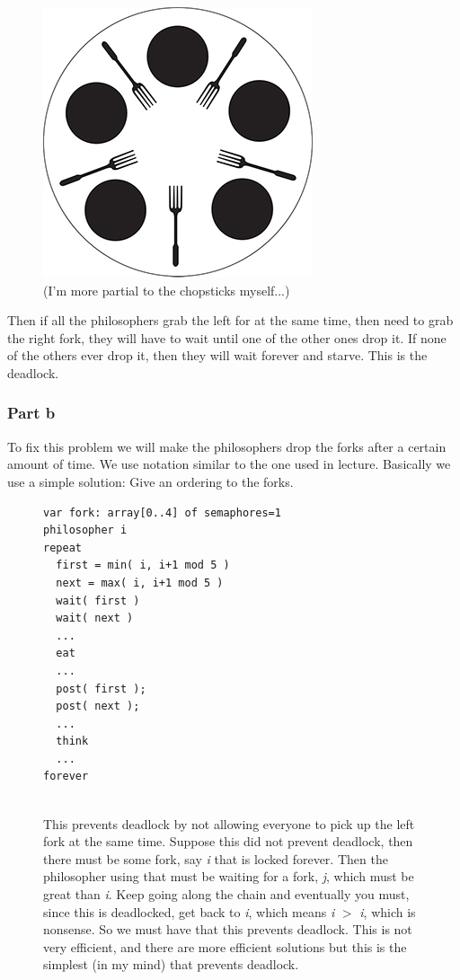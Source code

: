 \documentclass[english]{article}
\begin{document}
\begin{figure}[h!]
 \centering 
 \includegraphics[scale=0.35]{dining-philosophers-problem-small.jpg}
 \caption{(I'm more partial to the chopsticks myself...)}
\end{figure}


Then if all the philosophers grab the left for at the same time, then need to grab the right fork, they will have to wait until one of the other ones drop it.
If none of the others ever drop it, then they will wait forever and starve. This is the deadlock.

\subsubsection*{Part b}
To fix this problem we will make the philosophers drop the forks after a certain amount of time. We use notation similar to the one used in lecture. Basically
we use a simple solution: Give an ordering to the forks. 

\begin{figure}[h!]
\begin{lstlisting}
var fork: array[0..4] of semaphores=1
philosopher i
repeat
  first = min( i, i+1 mod 5 )
  next = max( i, i+1 mod 5 )
  wait( first )
  wait( next )
  ...
  eat
  ...
  post( first );
  post( next );
  ...
  think
  ...
forever
 
 \end{lstlisting}
 
 This prevents deadlock by not allowing everyone to pick up the left fork at the same time. Suppose this did not prevent deadlock, then there must be some fork, say \textit{i} 
 that is locked forever. Then the philosopher using that must be waiting for a fork, \textit{j}, which must be great than \textit{i}. Keep going along the chain and eventually
 you must, since this is deadlocked, get back to \textit{i}, which means \textit{i} $>$ \textit{i}, which is nonsense. So we must have that this prevents deadlock. This is not very
 efficient, and there are more efficient solutions but this is the simplest (in my mind) that prevents deadlock. 
 
\end{figure}
\end{document}
